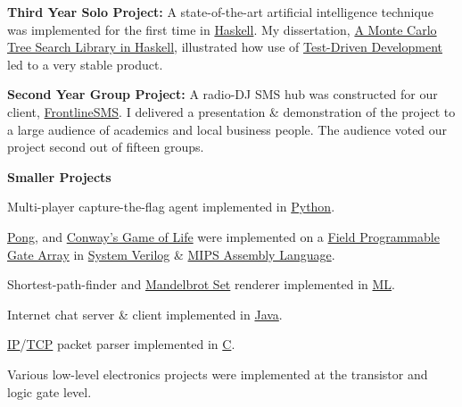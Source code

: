 \documentclass[10pt]{article}
\newenvironment{outerlist}[1][\enskip\textbullet]%
        {\begin{itemize}[#1]}{\end{itemize}%
         \vspace{-.6\baselineskip}}
\newenvironment{innerlist}[1][\enskip\textbullet]%
        {\begin{compactitem}[#1]}{\end{compactitem}}
\begin{document}
\begin{outerlist}
\item\textbf{Third Year Solo Project:} A state-of-the-art artificial intelligence technique was implemented for the first time in \href{http://www.haskell.org/haskellwiki/Introduction}{Haskell}. My dissertation, \href{https://github.com/abacathoo/dissertation/blob/master/latex/demodiss/diss.pdf?raw=true}{A Monte Carlo Tree Search Library in Haskell}, illustrated how use of \href{http://www.agiledata.org/images/tddSteps.jpg}{Test-Driven Development} led to a very stable product.

\item\textbf{Second Year Group Project:} A radio-DJ SMS hub was constructed for our client,  \href{http://frontlinesms.com}{FrontlineSMS}. I delivered a presentation \& demonstration of the project to a large audience of academics and local business people. The audience voted our project second out of fifteen groups.


\item\textbf{Smaller Projects} 
\begin{innerlist}
\item Multi-player capture-the-flag agent implemented in \href{http://www.python.org/doc/essays/blurb.html}{Python}. 
\item \href{http://www.ponggame.org/}{Pong}, and \href{http://demos.sftrabbit.co.uk/game-of-life/}{Conway's Game of Life} were implemented on a \href{http://www.altera.com/products/fpga.html}{Field Programmable Gate Array} in \href{http://www.systemverilog.org/}{System Verilog} \& \href{http://logos.cs.uic.edu/366/notes/mips%20quick%20tutorial.htm}{MIPS Assembly Language}. 
\item Shortest-path-finder and \href{http://www.math.utah.edu/~pa/math/mandelbrot/large.gif}{Mandelbrot Set} renderer implemented in \href{http://www.smlnj.org/sml.html}{ML}. \item Internet chat server \& client implemented in \href{http://java.sun.com/docs/overviews/java/java-overview-1.html}{Java}. 
\item \href{http://www.siongboon.com/projects/2006-03-06_serial_communication/IP-Header-v4.png}{IP}/\href{http://www.siongboon.com/projects/2006-03-06_serial_communication/TCP-Header.png}{TCP} packet parser implemented in \href{http://en.wikipedia.org/wiki/C_(programming_language)}{C}. 
\item Various low-level electronics projects were implemented at the transistor and logic gate level.
\end{innerlist}
\end{outerlist}
\end{document}
